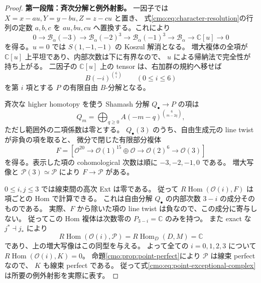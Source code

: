 \begin{proof}
\textbf{第一段階：斉次分解と例外射影。}
一因子では $X=x-au,Y=y-bu,Z=z-cu$ と置き、
式\eqref{cmo:eq:character-resolution}の行列の定数 $a,b,c$ を
$au,bu,cu$ へ置換する。これにより
\[
 0\to\mathcal B_\alpha(-3)\to\mathcal B_\alpha(-2)^3
 \to\mathcal B_\alpha(-1)^3\to\mathcal B_\alpha
 \to\mathbb C[u]\to0
\]
を得る。$u=0$ では $S(1,-1,-1)$ の Koszul 解消となる。
増大複体の全項が $\mathbb C[u]$ 上平坦であり、内部次数は下に有界なので、
$u$ による帰納法で完全性が持ち上がる。
二因子の $\mathbb C[u]$ 上の tensor は、右加群の規約へ移せば
\[
 B(-i)^{\binom6i}\qquad(0\leq i\leq6)
\]
を第 $i$ 項とする $P$ の有限自由 $B$-分解となる。

斉次な higher homotopy を使う Shamash 分解 $Q_\bullet\to P$ の項は
\[
 Q_m=\bigoplus_{q\ge0}A(-m-q)^{\binom6{m-2q}},
\]
ただし範囲外の二項係数は零とする。
$Q_\bullet(3)$ のうち、自由生成元の line twist が非負の項を取ると、
微分で閉じた有限部分複体
\begin{equation}\label{cmo:eq:point-exceptional-complex}
 F=\left[
 \mathcal O^{20}\longrightarrow
 \mathcal O(1)^{15}\oplus\mathcal O\longrightarrow
 \mathcal O(2)^6\longrightarrow\mathcal O(3)
 \right]
\end{equation}
を得る。表示した項の cohomological 次数は順に $-3,-2,-1,0$ である。
増大写像と $\mathcal P(3)\simeq\mathcal P$ により $F\to\mathcal P$ がある。

$0\leq i,j\leq3$ では線束間の高次 Ext は零である。
従って $R\operatorname{Hom}(\mathcal O(i),F)$ は項ごとの Hom で計算できる。
これは自由分解 $Q_\bullet$ の内部次数 $3-i$ の成分そのものである。
実際、$F$ から除いた項の line twist は負なので、この成分に寄与しない。
従ってこの Hom 複体は次数零の $P_{3-i}=\mathbb C$ のみを持つ。
また exact な $j^*\dashv j_*$ により
\[
 R\operatorname{Hom}(\mathcal O(i),\mathcal P)
 =R\operatorname{Hom}_D(D,M)=\mathbb C
\]
であり、上の増大写像はこの同型を与える。
よって全ての $i=0,1,2,3$ について $R\operatorname{Hom}(\mathcal O(i),K)=0$。
命題\ref{cmo:prop:point-perfect}により $\mathcal P$ は線束 perfect なので、
$K$ も線束 perfect である。
従って式\eqref{cmo:eq:point-exceptional-complex}は所要の例外射影を実際に表す。


\end{proof}
